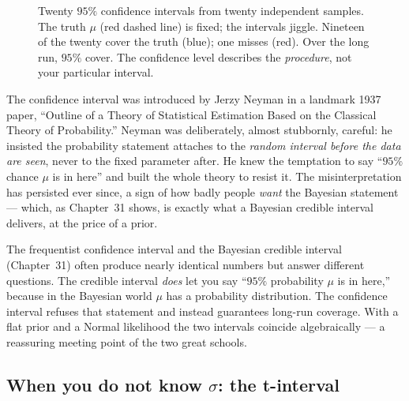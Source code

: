 \begin{figure}[H]
\caption{Twenty $95\%$ confidence intervals from twenty independent samples. The truth
$\mu$ (red dashed line) is fixed; the intervals jiggle. Nineteen of the twenty cover the
truth (blue); one misses (red). Over the long run, $95\%$ cover. The confidence level
describes the \emph{procedure}, not your particular interval.}
\label{ch32:fig-coverage}
\end{figure}

\begin{historybox}
The confidence interval was introduced by Jerzy Neyman in a landmark 1937 paper, ``Outline
of a Theory of Statistical Estimation Based on the Classical Theory of Probability.''
Neyman was deliberately, almost stubbornly, careful: he insisted the probability
statement attaches to the \emph{random interval before the data are seen}, never to the
fixed parameter after. He knew the temptation to say ``$95\%$ chance $\mu$ is in here''
and built the whole theory to resist it. The misinterpretation has persisted ever since,
a sign of how badly people \emph{want} the Bayesian statement --- which, as
Chapter~31 shows, is exactly what a Bayesian credible interval delivers, at the price of
a prior.
\end{historybox}

\begin{connectionbox}
The frequentist confidence interval and the Bayesian credible interval (Chapter~31)
often produce nearly identical numbers but answer different questions. The credible
interval \emph{does} let you say ``$95\%$ probability $\mu$ is in here,'' because in the
Bayesian world $\mu$ has a probability distribution. The confidence interval refuses
that statement and instead guarantees long-run coverage. With a flat prior and a Normal
likelihood the two intervals coincide algebraically --- a reassuring meeting point of
the two great schools.
\end{connectionbox}

\subsection{When you do not know $\sigma$: the t-interval}

